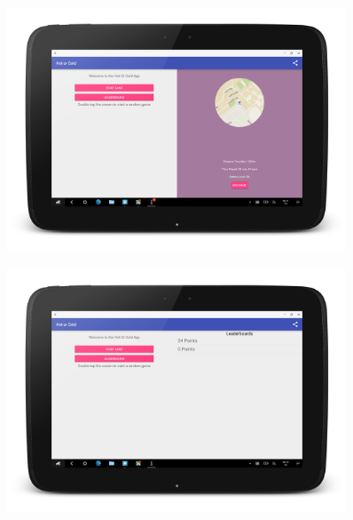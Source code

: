 \documentclass[10pt, a4paper]{article}
\begin{document}
\begin{figure}[!htb]
%
\begin{center}
  \includegraphics[width=0.9\textwidth]{tablet_game_1}
  \caption{}
\end{center}
\endminipage
\end{figure}

\begin{figure}[!htb]
%
\begin{center}
  \includegraphics[width=0.9\textwidth]{tablet_leaderboard_1}
  \caption{}
\end{center}
\endminipage
\end{figure}
\end{document}
